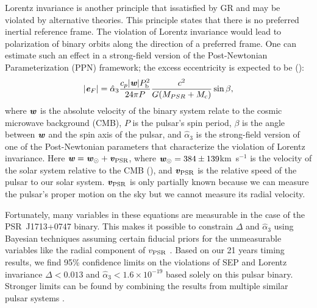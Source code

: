 Lorentz invariance is another principle that issatisfied by GR and may
be violated by alternative theories. This principle
states that there is no preferred inertial reference frame. The violation of
Lorentz invariance would lead to polarization of binary orbits along the
direction of a preferred frame.
One can estimate such an effect in a strong-field version of the Post-Newtonian Parameterization
(PPN) framework\cite{de92}; the excess eccentricity is expected to be (\citealt{bd96}):
\begin{equation}
|\textbf{\textit{e}}_F| = \hat{\alpha}_3 \frac{c_p|\textbf{\textit{w}}|P_{\rm b}^2}{24\pi P}
\frac{c^2}{G (M_{PSR}+M_{\rm c})}\sin \beta,
\end{equation}
where $\textbf{\textit{w}}$ is the absolute velocity of the binary system
relate to the cosmic microwave background (CMB), $P$ is the pulsar's spin period, $\beta$ is the
angle between $\textbf{\textit{w}}$ and the spin axis of the pulsar, and
$\hat{\alpha}_3$ is the strong-field version of one of the Post-Newtonian parameters that characterize the
violation of Lorentz invariance. 
Here $\textbf{\textit{w}} = \textbf{\textit{w}}_{\odot} + \textbf{\textit{v}}_{\rm PSR}$, where
$\textbf{\textit{w}}_{\odot}=384\pm139$km~s$^{-1}$ is the velocity of
the solar system relative to the CMB (\citealt{aaa+13}),
and $\textbf{\textit{v}}_{\rm PSR}$ is the relative speed of the pulsar to our solar system. $\textbf{\textit{v}}_{\rm PSR}$ is only partially known because we can measure the pulsar's
proper motion on the sky but we cannot measure its radial velocity.

Fortunately, many variables in these equations are measurable in the
case of the PSR~J1713+0747 binary. This makes it possible to constrain $\Delta$
and $\hat{\alpha}_3$ using Bayesian techniques assuming certain fiducial
priors for the unmeasurable variables like the radial component of
$v_{\rm PSR}$ \citep{sns+05, sfl+05, gsf+11}. Based on our 21 years 
timing results, we find 95\% confidence limits on the violations of SEP and
Lorentz invariance $\Delta < 0.013$ and
$\hat{\alpha}_3<1.6\times10^{-19}$ based solely on this pulsar
binary.  Stronger limits can be found by combining the results from
multiple similar pulsar systems \citep{wex00,sfl+05, gsf+11}.


